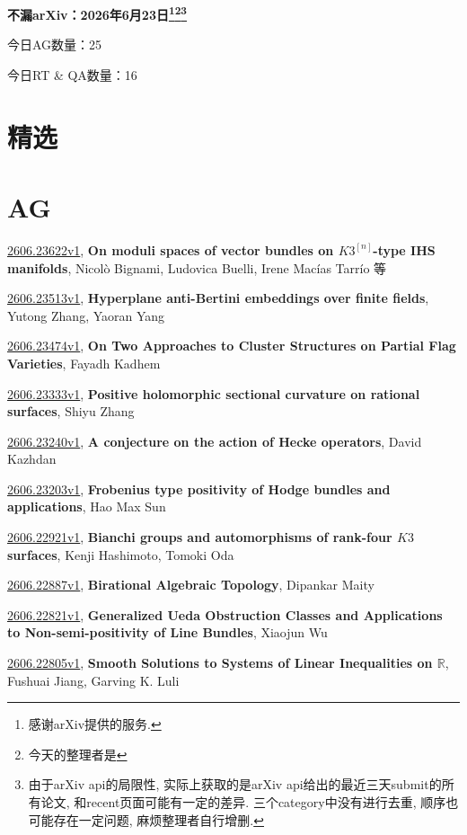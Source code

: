 \documentclass[9pt, a4paper]{article}
\theoremstyle{plain}
\theoremstyle{definition}
\theoremstyle{remark}
\newcommand{\arxiv}[3]{\href{https://arxiv.org/abs/#1}{#1}, \textbf{\textcolor{arxivblue}{#2}}, #3}
\newcommand{\AGnumber}{25}
\newcommand{\RTQAnumber}{16}
\newcommand{\NewestDate}{2026年6月23日}
\newcommand{\todayarXiver}{} %
\begin{document}
\begin{center}
    \Huge\textbf{不漏arXiv：\NewestDate\footnote{感谢arXiv提供的服务.}\footnote{今天的整理者是\todayarXiver}\footnote{由于arXiv api的局限性, 实际上获取的是arXiv api给出的最近三天submit的所有论文, 和recent页面可能有一定的差异. 三个category中没有进行去重, 顺序也可能存在一定问题, 麻烦整理者自行增删.}} \\
\end{center}

\setcounter{section}{-1}

\begin{center}
    今日AG数量：\AGnumber
    
    今日RT \& QA数量：\RTQAnumber
    
\end{center}


\section{精选}


\section{AG}
\arxiv{2606.23622v1}{On moduli spaces of vector bundles on $K3^{[n]}$-type IHS manifolds}{Nicolò Bignami, Ludovica Buelli, Irene Macías Tarrío 等}

\arxiv{2606.23513v1}{Hyperplane anti-Bertini embeddings over finite fields}{Yutong Zhang, Yaoran Yang}

\arxiv{2606.23474v1}{On Two Approaches to Cluster Structures on Partial Flag Varieties}{Fayadh Kadhem}

\arxiv{2606.23333v1}{Positive holomorphic sectional curvature on rational surfaces}{Shiyu Zhang}

\arxiv{2606.23240v1}{A conjecture on the action of Hecke operators}{David Kazhdan}

\arxiv{2606.23203v1}{Frobenius type positivity of Hodge bundles and applications}{Hao Max Sun}

\arxiv{2606.22921v1}{Bianchi groups and automorphisms of rank-four $K3$ surfaces}{Kenji Hashimoto, Tomoki Oda}

\arxiv{2606.22887v1}{Birational Algebraic Topology}{Dipankar Maity}

\arxiv{2606.22821v1}{Generalized Ueda Obstruction Classes and Applications to Non-semi-positivity of Line Bundles}{Xiaojun Wu}

\arxiv{2606.22805v1}{Smooth Solutions to Systems of Linear Inequalities on $\mathbb{R}$}{Fushuai Jiang, Garving K. Luli}
\end{document}
